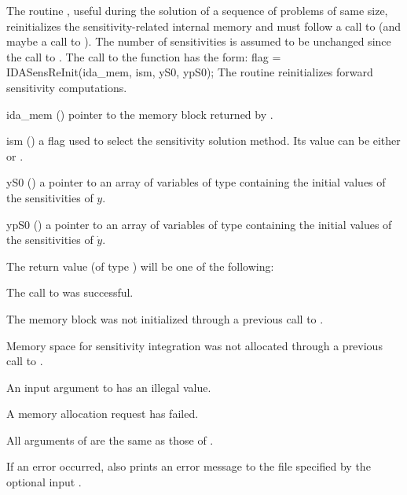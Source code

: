 The routine , useful during the solution of a sequence of problems of 
same size, reinitializes the sensitivity-related internal memory 
and must follow a call to  (and maybe a call to ). 
The number  of sensitivities is assumed to be unchanged since the call to 
.
The call to the  function has the form:
{
  flag = IDASensReInit(ida\_mem, ism, yS0, ypS0);
}
{
  The routine  reinitializes forward sensitivity computations.
}
{
  \begin{args}

  \item[ida\_mem] ()
    pointer to the {\idas} memory block returned by .

  \item[ism] ()
    a flag used to select the sensitivity solution method.  Its value can 
    be either  or .
  \item[yS0] () 
    a pointer to an array of  variables of type  containing the 
    initial values of the sensitivities of $y$.
  \item[ypS0] () 
    a pointer to an array of  variables of type  containing the 
    initial values of the sensitivities of $\dot{y}$.
  \end{args}
}
{
  The return value  (of type ) will be one of the following:
  \begin{args}
  \item[\Id{IDA\_SUCCESS}]
    The call to  was successful.
  \item[\Id{IDA\_MEM\_NULL}] 
    The {\idas} memory block was not initialized through a 
    previous call to .
  \item[\Id{IDA\_NO\_SENS}]
    Memory space for sensitivity integration was not allocated through a 
    previous call to .
  \item[\Id{IDA\_ILL\_INPUT}] 
    An input argument to  has an illegal value.    
  \item[\Id{IDA\_MEM\_FAIL}] 
    A memory allocation request has failed.
  \end{args}
}
{
  All arguments of  are the same as those of
  .

  If an error occurred,  also prints an error message to the
  file specified by the optional input .
}
